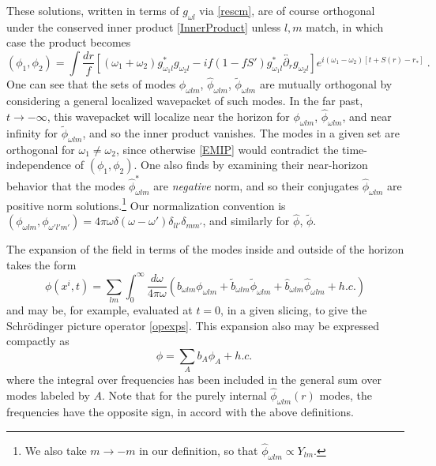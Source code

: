 \documentclass[11pt]{article}
\numberwithin{equation}{section}
\newcommand{\beq}{\begin{equation}}
\newcommand{\eeq}{\end{equation}}
\begin{document}
These solutions, written in terms of $g_{\omega l}$ via  
 \eqref{rescm}, are of course orthogonal under the conserved inner product \eqref{InnerProduct}
unless $l,m$ match, in which case the product becomes
\beq\label{EMIP}
(\phi_1,\phi_2)= \int \frac {dr}{f} \left[(\omega_1+\omega_2) g_{\omega_1l}^* g_{\omega_2l} - i f(1-fS') g_{\omega_1l}^* \overleftrightarrow{\partial_r} g_{\omega_2l} \right] e^{i(\omega_1-\omega_2)[t+S(r)-r_*]}\ .
\eeq
One can see that the sets of modes $\phi_{\omega lm}$, $\hat \phi_{\omega lm}$, $\tilde \phi_{\omega lm}$ are mutually orthogonal by considering a general localized wavepacket of such modes.  In the far past, $t\rightarrow-\infty$, this wavepacket will localize near the horizon for $\phi_{\omega lm}$, $\hat \phi_{\omega lm}$, and near infinity for $\tilde \phi_{\omega lm}$, and so the inner product vanishes.  The modes in a given set 
are orthogonal for $\omega_1\neq \omega_2$, since otherwise \eqref{EMIP}  would contradict the time-independence of $(\phi_1,\phi_2)$.  
One also finds by examining their near-horizon behavior that the modes $\hat \phi^*_{\omega lm}$ are {\it negative} norm, and so their conjugates $\hat \phi_{\omega lm}$ are  positive norm solutions.\footnote{We also take $m\rightarrow-m$ in our definition, so that $\hat \phi_{\omega l m} \propto Y_{lm}$.}  Our normalization convention is $(\phi_{\omega l m},\phi_{\omega' l' m'}) = 4\pi \omega \delta(\omega-\omega') \delta_{ll'}\delta_{mm'}$, and similarly for $\hat \phi$, $\tilde \phi$.  


The expansion of the field in terms of the modes  inside and outside of the horizon takes the form
\beq
\phi(x^i,t)= \sum_{lm}\int_0^\infty \frac{d\omega}{4\pi\omega}\left(b_{\omega l m} \phi_{\omega l m} + \tilde b_{\omega lm} \tilde\phi_{\omega l m} + \hat b_{\omega lm} \hat  \phi_{\omega l m} + h.c.\right)
\eeq
and may be, for example, evaluated at $t=0$, in a given slicing, to give the Schr\"odinger picture operator \eqref{opexps}.
This expansion also may be expressed compactly as
\beq\label{phiexp}
\phi= \sum_{A} b_A \phi_A + h.c.\ 
\eeq
where the integral over frequencies has been included in the general sum over modes labeled by $A$.
Note that for the purely internal $\hat \phi_{\omega lm}(r)$ modes, the frequencies have the opposite sign, in accord with the above definitions.   
\end{document}
